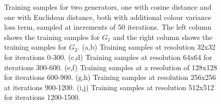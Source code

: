 \begin{figure}[!htbp]
    \hfill
    \hfill
    \hfill
    \hfill
    \hfill
    \caption[Training samples for two generators, one with cosine distance and one with Euclidean distance, both with additional colour variance loss term]{Training samples for two generators, one with cosine distance and one with Euclidean distance, both with additional colour variance loss term, sampled at increments of 50 iterations. The left column shows the training samples for $G_{1}$ and the right column shows the training samples for $G_{2}$. (a,b) Training samples at resolution 32x32 for iterations 0-300. (c,d) Training samples at resolution 64x64 for iterations 300-600. (e,f) Training samples at a resolution of 128x128 for iterations 600-900. (g,h) Training samples at resolution 256x256 at iterations 900-1200. (i,j) Training samples at resolution 512x512 for iterations 1200-1500.}
    \label{fig:c3:samples-cosine-euclid}
  \end{figure}

